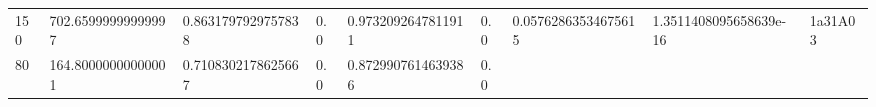 \documentclass[11pt,a4paper,twoside]{book}
\theoremstyle{definition}
\theoremstyle{definition}
\theoremstyle{remark}
\begin{document}
\begin{longtable}[]{@{}lllllllll@{}}
\begin{minipage}[t]{0.04\columnwidth}\raggedright\strut
150\strut
\end{minipage} & \begin{minipage}[t]{0.04\columnwidth}\raggedright\strut
702.65999999999997\strut
\end{minipage} & \begin{minipage}[t]{0.04\columnwidth}\raggedright\strut
0.8631797929757838\strut
\end{minipage} & \begin{minipage}[t]{0.04\columnwidth}\raggedright\strut
0.0\strut
\end{minipage} & \begin{minipage}[t]{0.04\columnwidth}\raggedright\strut
0.9732092647811911\strut
\end{minipage} & \begin{minipage}[t]{0.04\columnwidth}\raggedright\strut
0.0\strut
\end{minipage} & \begin{minipage}[t]{0.04\columnwidth}\raggedright\strut
0.05762863534675615\strut
\end{minipage} & \begin{minipage}[t]{0.04\columnwidth}\raggedright\strut
1.3511408095658639e-16\strut
\end{minipage} & \begin{minipage}[t]{0.04\columnwidth}\raggedright\strut
1a31A03\strut
\end{minipage}\tabularnewline
\begin{minipage}[t]{0.04\columnwidth}\raggedright\strut
80\strut
\end{minipage} & \begin{minipage}[t]{0.04\columnwidth}\raggedright\strut
164.80000000000001\strut
\end{minipage} & \begin{minipage}[t]{0.04\columnwidth}\raggedright\strut
0.7108302178625667\strut
\end{minipage} & \begin{minipage}[t]{0.04\columnwidth}\raggedright\strut
0.0\strut
\end{minipage} & \begin{minipage}[t]{0.04\columnwidth}\raggedright\strut
0.8729907614639386\strut
\end{minipage} & \begin{minipage}[t]{0.04\columnwidth}\raggedright\strut
0.0\strut
\end{minipage} & \begin{minipage}[t]{0.04\columnwidth}\raggedright\strut

\end{minipage}
\end{longtable}
\end{document}
